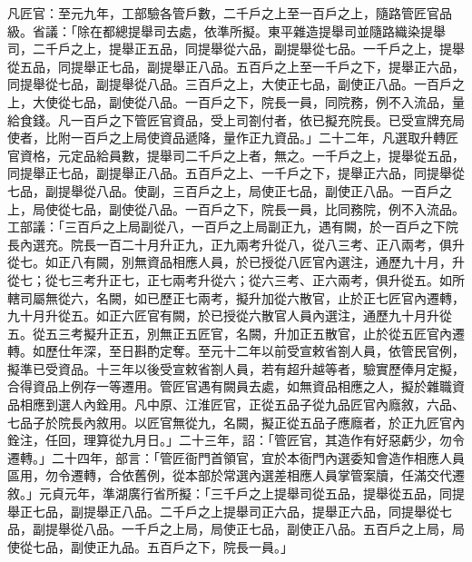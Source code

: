 \begin{pinyinscope}
 凡匠官：至元九年，工部驗各管戶數，二千戶之上至一百戶之上，隨路管匠官品級。省議：「除在都總提舉司去處，依準所擬。東平雜造提舉司並隨路織染提舉司，二千戶之上，提舉正五品，同提舉從六品，副提舉從七品。一千戶之上，提舉從五品，同提舉正七品，副提舉正八品。五百戶之上至一千戶之下，提舉正六品，同提舉從七品，副提舉從八品。三百戶之上，大使正七品，副使正八品。一百戶之上，大使從七品，副使從八品。一百戶之下，院長一員，同院務，例不入流品，量給食錢。凡一百戶之下管匠官資品，受上司劄付者，依已擬充院長。已受宣牌充局使者，比附一百戶之上局使資品遞降，量作正九資品。」二十二年，凡選取升轉匠官資格，元定品給員數，提舉司二千戶之上者，無之。一千戶之上，提舉從五品，同提舉正七品，副提舉正八品。五百戶之上、一千戶之下，提舉正六品，同提舉從七品，副提舉從八品。使副，三百戶之上，局使正七品，副使正八品。一百戶之上，局使從七品，副使從八品。一百戶之下，院長一員，比同務院，例不入流品。工部議：「三百戶之上局副從八，一百戶之上局副正九，遇有闕，於一百戶之下院長內選充。院長一百二十月升正九，正九兩考升從八，從八三考、正八兩考，俱升從七。如正八有闕，別無資品相應人員，於已授從八匠官內選注，通歷九十月，升從七；從七三考升正七，正七兩考升從六；從六三考、正六兩考，俱升從五。如所轄司屬無從六，名闕，如已歷正七兩考，擬升加從六散官，止於正七匠官內遷轉，九十月升從五。如正六匠官有闕，於已授從六散官人員內選注，通歷九十月升從五。從五三考擬升正五，別無正五匠官，名闕，升加正五散官，止於從五匠官內遷轉。如歷仕年深，至日斟酌定奪。至元十二年以前受宣敕省劄人員，依管民官例，擬準已受資品。十三年以後受宣敕省劄人員，若有超升越等者，驗實歷俸月定擬，合得資品上例存一等遷用。管匠官遇有闕員去處，如無資品相應之人，擬於雜職資品相應到選人內銓用。凡中原、江淮匠官，正從五品子從九品匠官內廕敘，六品、七品子於院長內敘用。以匠官無從九，名闕，擬正從五品子應廕者，於正九匠官內銓注，任回，理算從九月日。」二十三年，詔：「管匠官，其造作有好惡虧少，勿令遷轉。」二十四年，部言：「管匠衙門首領官，宜於本衙門內選委知會造作相應人員區用，勿令遷轉，合依舊例，從本部於常選內選差相應人員掌管案牘，任滿交代遷敘。」元貞元年，準湖廣行省所擬：「三千戶之上提舉司從五品，提舉從五品，同提舉正七品，副提舉正八品。二千戶之上提舉司正六品，提舉正六品，同提舉從七品，副提舉從八品。一千戶之上局，局使正七品，副使正八品。五百戶之上局，局使從七品，副使正九品。五百戶之下，院長一員。」




\end{pinyinscope}
